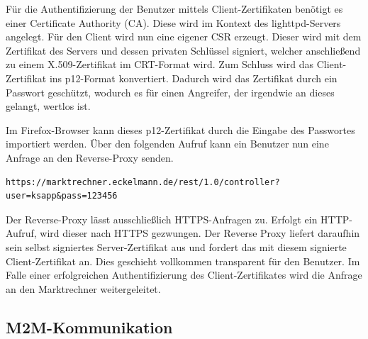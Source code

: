 \documentclass[11pt,a4paper]{report}
\begin{document}
Für die Authentifizierung der Benutzer mittels Client-Zertifikaten benötigt es einer Certificate Authority (CA). Diese wird im Kontext des lighttpd-Servers angelegt. Für den Client wird nun eine eigener CSR erzeugt. Dieser wird mit dem Zertifikat des Servers und dessen privaten Schlüssel signiert, welcher anschließend zu einem X.509-Zertifikat im CRT-Format wird. Zum Schluss wird das Client-Zertifikat ins p12-Format konvertiert. Dadurch wird das Zertifikat durch ein Passwort geschützt, wodurch es für einen Angreifer, der irgendwie an dieses gelangt, wertlos ist. 

Im Firefox-Browser kann dieses p12-Zertifikat durch die Eingabe des Passwortes importiert werden. Über den folgenden Aufruf kann ein Benutzer nun eine Anfrage an den Reverse-Proxy senden. 

\begin{lstlisting}[caption=HTTPS-Anfrage an Reverse Proxy, label=lst:https_request]
https://marktrechner.eckelmann.de/rest/1.0/controller?user=ksapp&pass=123456
\end{lstlisting}

Der Reverse-Proxy lässt ausschließlich HTTPS-Anfragen zu. Erfolgt ein HTTP-Aufruf, wird dieser nach HTTPS gezwungen. Der Reverse Proxy liefert daraufhin sein selbst signiertes Server-Zertifikat aus und fordert das mit diesem signierte Client-Zertifikat an. Dies geschieht vollkommen transparent für den Benutzer. Im Falle einer erfolgreichen Authentifizierung des Client-Zertifikates wird die Anfrage an den Marktrechner weitergeleitet.

\subsection{M2M-Kommunikation}
\end{document}
